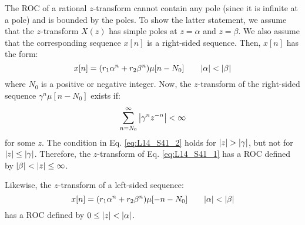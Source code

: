 \documentclass[../../main/main.tex]{subfiles}
\begin{document}
\medskip
The ROC of a rational \( z \)-transform cannot contain any pole (since it is infinite at a pole) and is bounded by the poles.
To show the latter statement, we assume that the \( z \)-transform \( X(z) \) has simple poles at \( z = \alpha \) and \( z = \beta \). We also assume that the corresponding sequence \( x[n] \) is a right-sided sequence.
Then, \( x[n] \) has the form:
\begin{equation}
    x[n]
    =
    \qty(r_{1}\alpha^{n} + r_{2}\beta^{n}) \mu[n-N_{0}]
    \qquad
    \abs{\alpha} < \abs{\beta}
    \label{eq:L14_S41_1}
\end{equation}
where \( N_{0} \) is a positive or negative integer. Now, the \( z \)-transform of the right-sided sequence \( \gamma^{n} \mu[n-N_{0}] \) exists if:
\begin{equation}
    \sum_{n=N_{0}}^{\infty} \abs{\gamma^{n}z^{-n}}
    <
    \infty
    \label{eq:L14_S41_2}
\end{equation}
for some \( z \). The condition in Eq. \ref{eq:L14_S41_2} holds for \( \abs{z} > \abs{\gamma} \), but not for \( \abs{z} \le \abs{\gamma} \). Therefore, the \( z \)-transform of Eq. \ref{eq:L14_S41_1} has a ROC defined by \( \abs{\beta} < \abs{z} \le \infty \).

Likewise, the \( z \)-transform of a left-sided sequence:
\begin{equation}
    x[n]
    =
    \qty(r_{1}\alpha^{n} + r_{2}\beta^{n}) \mu[-n-N_{0}]
    \qquad
    \abs{\alpha} < \abs{\beta}
    \label{eq:L14_S43_1}
\end{equation}
has a ROC defined by \( 0 \le \abs{z} < \abs{\alpha} \).
\end{document}
